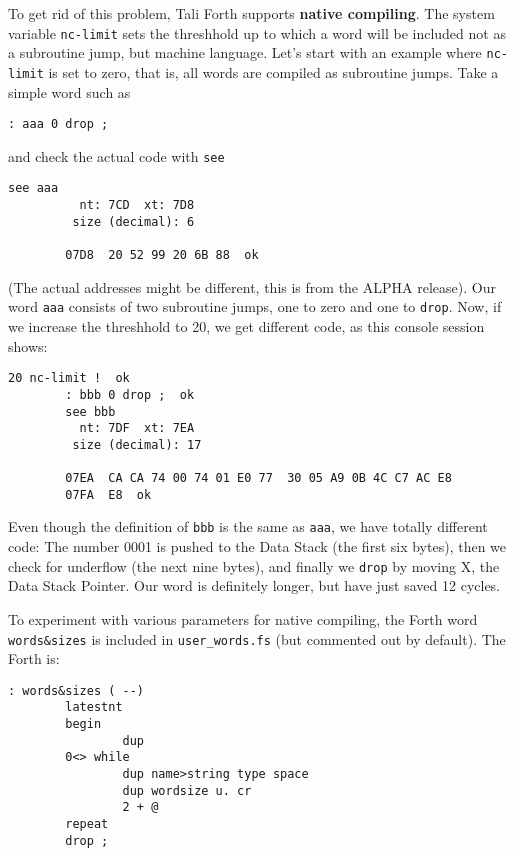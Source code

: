 To get rid of this problem, Tali Forth supports \textbf{native
compiling}. The system variable
\texttt{nc-limit} sets
the threshhold up to which a word will be included not as a subroutine jump, but
machine language. Let's start with an example where \texttt{nc-limit} is set to
zero, that is, all words are compiled as subroutine jumps. Take a simple word
such as

\begin{lstlisting}[frame=lines]
        : aaa 0 drop ;
\end{lstlisting}

\noindent and check the actual code with \texttt{see}

\begin{lstlisting}[frame=lines]
        see aaa
          nt: 7CD  xt: 7D8
         size (decimal): 6

        07D8  20 52 99 20 6B 88  ok
\end{lstlisting}

\noindent (The actual addresses might be different, this is from the ALPHA release).  Our
word \texttt{aaa} consists of two subroutine jumps, one to zero and one to
\texttt{drop}. Now, if we increase the threshhold to 20, we get different code,
as this console session shows:

\begin{lstlisting}[frame=lines]
        20 nc-limit !  ok
        : bbb 0 drop ;  ok
        see bbb
          nt: 7DF  xt: 7EA
         size (decimal): 17

        07EA  CA CA 74 00 74 01 E0 77  30 05 A9 0B 4C C7 AC E8
        07FA  E8  ok
\end{lstlisting}

\noindent Even though the definition of \texttt{bbb} is the same as \texttt{aaa}, we have
totally different code: The number 0001 is pushed to the Data Stack (the first
six bytes), then we check for underflow (the next nine bytes),
and finally we \texttt{drop} by moving X, the Data Stack
Pointer. Our word is definitely longer, but have just saved 12 cycles.

To experiment with various parameters for native compiling, the Forth word
\texttt{words\&sizes} is included in \texttt{user\_words.fs} (but commented out 
by default). The Forth is:

\begin{lstlisting}[frame=lines]
: words&sizes ( --)
        latestnt
        begin
                dup
        0<> while
                dup name>string type space
                dup wordsize u. cr      
                2 + @
        repeat
        drop ;
\end{lstlisting}

